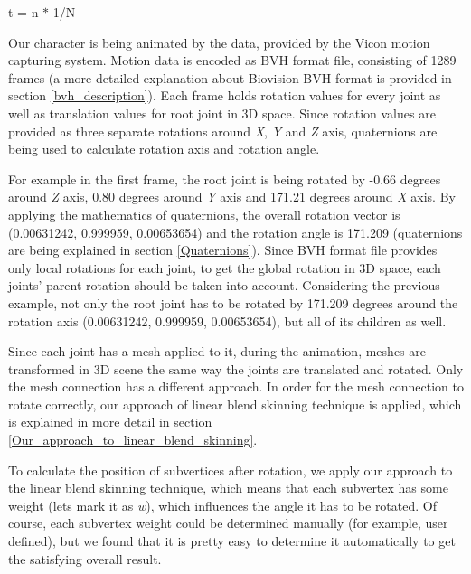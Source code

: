 \documentclass[times, 10pt,twocolumn]{article}
\begin{document}
\begin{center}
t = n $\ast$ 1/N
\end{center}


\label{animating_our_character}

Our character is being animated by the data, provided by the Vicon motion capturing system. Motion data is encoded as BVH format file, consisting of  1289 frames (a more detailed explanation about Biovision BVH format is provided in section \ref{bvh_description}). Each frame holds rotation values for every joint as well as translation values for root joint in 3D space. Since rotation values are provided as three separate rotations around \emph{X}, \emph{Y} and \emph{Z} axis, quaternions are being used to calculate rotation axis and rotation angle.

For example in the first frame, the root joint is being rotated by -0.66 degrees around \emph{Z} axis, 0.80 degrees around \emph{Y} axis and 171.21 degrees around \emph{X} axis. By applying the mathematics of quaternions, the overall rotation vector is (0.00631242, 0.999959, 0.00653654) and the rotation angle is 171.209 (quaternions are being explained in section \ref{Quaternions}). Since BVH format file provides only local rotations for each joint, to get the global rotation in 3D space, each joints' parent rotation should be taken into account. Considering the previous example, not only the root joint has to be rotated by 171.209 degrees around the rotation axis  (0.00631242, 0.999959, 0.00653654), but all of its children as well.

Since each joint has a mesh applied to it, during the animation, meshes are transformed in 3D scene the same way the joints are translated and rotated. Only the mesh connection has a different approach. In order for the mesh connection to rotate correctly, our approach of linear blend skinning technique is applied, which is explained in more detail in section \ref{Our_approach_to_linear_blend_skinning}.

\label{Our_approach_to_linear_blend_skinning}

To calculate the position of subvertices after rotation, we apply our approach to the linear blend skinning technique, which means that each subvertex has some weight (lets mark it as \emph{w}), which influences the angle it has to be rotated. Of course, each subvertex weight could be determined manually (for example, user defined), but we found that it is pretty easy to determine it automatically to get the satisfying overall result.
\end{document}
